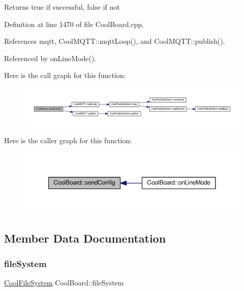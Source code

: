 \begin{DoxyReturn}{Returns}
true if successful, false if not 
\end{DoxyReturn}


Definition at line 1470 of file Cool\+Board.\+cpp.



References mqtt, Cool\+M\+Q\+T\+T\+::mqtt\+Loop(), and Cool\+M\+Q\+T\+T\+::publish().



Referenced by on\+Line\+Mode().

Here is the call graph for this function\+:
\nopagebreak
\begin{figure}[H]
\begin{center}
\leavevmode
\includegraphics[width=350pt]{d7/df9/class_cool_board_a705398b11560603fcdd1b9e8e95d0027_cgraph}
\end{center}
\end{figure}
Here is the caller graph for this function\+:
\nopagebreak
\begin{figure}[H]
\begin{center}
\leavevmode
\includegraphics[width=350pt]{d7/df9/class_cool_board_a705398b11560603fcdd1b9e8e95d0027_icgraph}
\end{center}
\end{figure}


\subsection{Member Data Documentation}
\mbox{\label{class_cool_board_a42c2586fbb13ff7f06538e9284e8538d}} 
\subsubsection{\texorpdfstring{file\+System}{fileSystem}}
{\footnotesize\ttfamily \hyperlink{class_cool_file_system}{Cool\+File\+System} Cool\+Board\+::file\+System\hspace{0.3cm}{\ttfamily [private]}}

